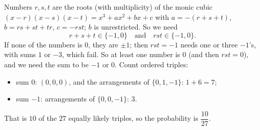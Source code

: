 Numbers $r,s,t$ are the roots (with multiplicity) of the monic cubic $(x-r)(x-s)(x-t)=x^3+ax^2+bx+c$ with $a=-(r+s+t)$, $b=rs+st+tr$, $c=-rst$; $b$ is unrestricted. So we need
\[
r+s+t\in\{-1,0\}\quad\text{and}\quad rst\in\{-1,0\}.
\]
If none of the numbers is $0$, they are $\pm1$; then $rst=-1$ needs one or three $-1$'s, with sums $1$ or $-3$, which fail. So at least one number is $0$ (and then $rst=0$), and we need the sum to be $-1$ or $0$. Count ordered triples:
\begin{itemize}
\item sum $0$: $(0,0,0)$, and the arrangements of $\{0,1,-1\}$: $1+6=7$;
\item sum $-1$: arrangements of $\{0,0,-1\}$: $3$.
\end{itemize}
That is $10$ of the $27$ equally likely triples, so the probability is $\boxed{\dfrac{10}{27}}$.
